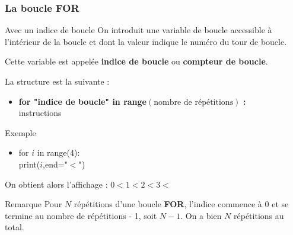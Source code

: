 \documentclass[8pt]{beamer}
\newcounter{num}
\begin{document}
\begin{frame}
\frametitle{La boucle FOR}

\begin{block}{Avec un indice de boucle}
On introduit une variable de boucle accessible à l'intérieur de la boucle et dont la valeur indique le numéro du tour de boucle. 

Cette variable est appelée \textbf{indice de boucle} ou \textbf{compteur de boucle}.

La structure est la suivante :
\begin{itemize}
\item \textbf{for "indice de boucle" in range}$(\text{nombre de répétitions})$ \textbf{:}\\
\hspace{0.5cm} instructions\\
\end{itemize}
\end{block}

\begin{exampleblock}{Exemple}
\begin{itemize}
\item for $i$ in range(4):\\
\hspace{0.5cm}print($i$,end="$<$")
\end{itemize}
On obtient alors l'affichage : $0<1<2<3<$
\end{exampleblock}

\begin{alertblock}{Remarque}
Pour $N$ répétitions d'une boucle \textbf{FOR}, l'indice commence à $0$ et se termine au nombre de répétitions - 1, soit $N-1$. On a bien $N$ répétitions au total.
\end{alertblock}

\end{frame}
\end{document}
